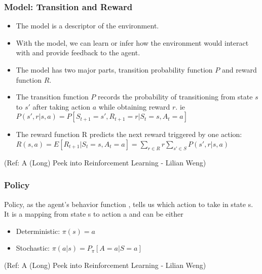 \begin{frame}[fragile]\frametitle{Model: Transition and Reward}


\begin{itemize}
\item The model is a descriptor of the environment. 
\item With the model, we can learn or infer how the
environment would interact with and provide feedback to the agent. 
\item The model has two major parts, transition probability function $P$ and reward function $R$.
\item The transition function $P$ records the probability of transitioning from state $s$ to $s'$ after taking action $a$
while obtaining reward $r$. ie $P(s',r|s,a)=P[S_{t+1} = s',R_{t+1} = r|S_t = s, A_t = a]$
\item The reward function R predicts the next reward triggered by one action: $R(s,a) = E[R_{t+1} |S_t = s, A_t = a] = \sum_{r \in R} r \sum_{s' \in S}P(s',r|s,a)$
\end{itemize}

{\tiny (Ref: A (Long) Peek into Reinforcement Learning - Lilian Weng)}


\end{frame}

\begin{frame}[fragile]\frametitle{Policy}

Policy, as the agent’s behavior function  , tells us which action to take in state s. It is a mapping from
state s to action a and can be either 

\begin{itemize}
\item Deterministic: $\pi(s)=a$
\item Stochastic: $\pi (a|s) = P_{\pi}[A=a|S=a]$
\end{itemize}

{\tiny (Ref: A (Long) Peek into Reinforcement Learning - Lilian Weng)}


\end{frame}

